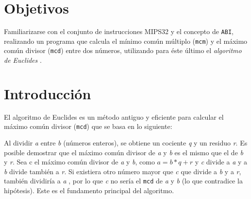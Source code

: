 \documentclass[titlepage,a4paper]{article}
\begin{document}
\tableofcontents %
\newpage


\section{Objetivos}\label{sec:objetivos}
Familiarizarse con el conjunto de instrucciones MIPS32 y el concepto de \verb|ABI|, realizando un programa que calcula el mínimo común múltiplo (\verb|mcm|) y el máximo común divisor (\verb|mcd|) entre dos números, utilizando para éste último el \textit{algoritmo de Euclides} \cite{euclidean_algorithm}.

\section{Introducción}\label{sec:intro}
El algoritmo de Euclides es un método antiguo y eficiente para calcular el máximo común divisor (\verb|mcd|) que se basa en lo siguiente: \newline

Al dividir \textit{a} entre \textit{b} (números enteros), se obtiene un cociente \textit{q} y un residuo \textit{r}. Es posible demostrar que el máximo común divisor de \textit{a} y \textit{b} es el mismo que el de \textit{b} y \textit{r}. Sea c el máximo común divisor de \textit{a} y \textit{b}, como $a = b * q + r$ y \textit{c} divide a \textit{a} y a \textit{b} divide también a \textit{r}. Si existiera otro número mayor que \textit{c} que divide a \textit{b} y a \textit{r}, también dividiría a \textit{a} , por lo que \textit{c} no sería el \verb|mcd| de \textit{a} y \textit{b} (lo que contradice la hipótesis). Este es el fundamento principal del algoritmo. \newline
\end{document}
